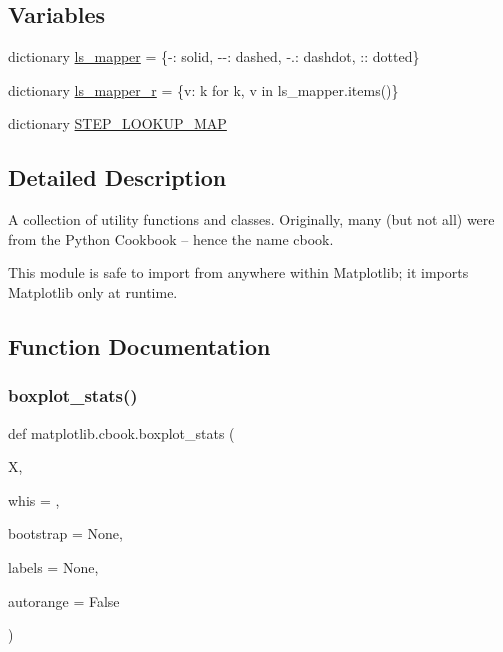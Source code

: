 \subsection*{Variables}
\begin{DoxyCompactItemize}
\item 
dictionary \hyperlink{namespacematplotlib_1_1cbook_ac142c2daf9ce1acc76fb1d8748cb331f}{ls\+\_\+mapper} = \{\textquotesingle{}-\/\textquotesingle{}\+: \textquotesingle{}solid\textquotesingle{}, \textquotesingle{}-\/-\/\textquotesingle{}\+: \textquotesingle{}dashed\textquotesingle{}, \textquotesingle{}-\/.\textquotesingle{}\+: \textquotesingle{}dashdot\textquotesingle{}, \textquotesingle{}\+:\textquotesingle{}\+: \textquotesingle{}dotted\textquotesingle{}\}
\item 
dictionary \hyperlink{namespacematplotlib_1_1cbook_adb3290becfb5c026bb2ede58b5ce05fa}{ls\+\_\+mapper\+\_\+r} = \{v\+: k for k, v in ls\+\_\+mapper.\+items()\}
\item 
dictionary \hyperlink{namespacematplotlib_1_1cbook_ae4d385490090a4c9ed6f059cb2dedb5d}{S\+T\+E\+P\+\_\+\+L\+O\+O\+K\+U\+P\+\_\+\+M\+AP}
\end{DoxyCompactItemize}


\subsection{Detailed Description}
\begin{DoxyVerb}A collection of utility functions and classes.  Originally, many
(but not all) were from the Python Cookbook -- hence the name cbook.

This module is safe to import from anywhere within Matplotlib;
it imports Matplotlib only at runtime.
\end{DoxyVerb}
 

\subsection{Function Documentation}
\mbox{\label{namespacematplotlib_1_1cbook_a09feb80736ebe2521845f87e1941bc14}} 
\subsubsection{\texorpdfstring{boxplot\+\_\+stats()}{boxplot\_stats()}}
{\footnotesize\ttfamily def matplotlib.\+cbook.\+boxplot\+\_\+stats (\begin{DoxyParamCaption}\item[{}]{X,  }\item[{}]{whis = {},  }\item[{}]{bootstrap = {\ttfamily None},  }\item[{}]{labels = {\ttfamily None},  }\item[{}]{autorange = {\ttfamily False} }\end{DoxyParamCaption})}

